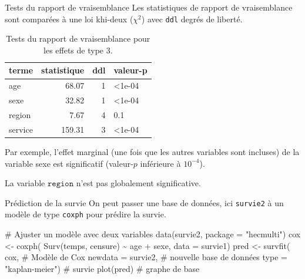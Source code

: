 \documentclass[
  ignorenonframetext,
]{beamer}
\newenvironment{Shaded}{\begin{snugshade}}{\end{snugshade}}
\newcommand{\AttributeTok}[1]{\textcolor[rgb]{0.40,0.45,0.13}{#1}}
\newcommand{\CommentTok}[1]{\textcolor[rgb]{0.37,0.37,0.37}{#1}}
\newcommand{\FunctionTok}[1]{\textcolor[rgb]{0.28,0.35,0.67}{#1}}
\newcommand{\NormalTok}[1]{\textcolor[rgb]{0.00,0.23,0.31}{#1}}
\newcommand{\OtherTok}[1]{\textcolor[rgb]{0.00,0.23,0.31}{#1}}
\newcommand{\SpecialCharTok}[1]{\textcolor[rgb]{0.37,0.37,0.37}{#1}}
\newcommand{\StringTok}[1]{\textcolor[rgb]{0.13,0.47,0.30}{#1}}
\begin{document}
\begin{frame}[fragile]{Tests du rapport de vraisemblance}
\protect{}\label{tests-du-rapport-de-vraisemblance}
Les statistiques de rapport de vraisemblance sont comparées à une loi
khi-deux (\(\chi^2\)) avec \texttt{ddl} degrés de liberté.

\begin{longtable}[t]{lrrl}

\caption{\label{tbl-survie5-deviance}Tests du rapport de vraisemblance
pour les effets de type 3.}

\tabularnewline

\toprule
terme & statistique & ddl & valeur-p\\
\midrule
age & 68.07 & 1 & <1e-04\\
sexe & 32.82 & 1 & <1e-04\\
region & 7.67 & 4 & 0.1\\
service & 159.31 & 3 & <1e-04\\
\bottomrule

\end{longtable}

Par exemple, l'effet marginal (une fois que les autres variables sont
incluses) de la variable sexe est significatif (valeur-\(p\) inférieure
à \(10^{-4}\)).

La variable \(\texttt{region}\) n'est pas globalement significative.
\end{frame}

\begin{frame}[fragile]{Prédiction de la survie}
\protect{}\label{pruxe9diction-de-la-survie}
On peut passer une base de données, ici \texttt{survie2} à un modèle de
type \texttt{coxph} pour prédire la survie.

\begin{Shaded}
\begin{Highlighting}[numbers=left,,]
\CommentTok{\# Ajuster un modèle avec deux variables}
\FunctionTok{data}\NormalTok{(survie2, }\AttributeTok{package =} \StringTok{"hecmulti"}\NormalTok{)}
\NormalTok{cox }\OtherTok{\textless{}{-}} \FunctionTok{coxph}\NormalTok{(}
  \FunctionTok{Surv}\NormalTok{(temps, censure) }\SpecialCharTok{\textasciitilde{}} 
\NormalTok{    age }\SpecialCharTok{+}\NormalTok{ sexe, }
  \AttributeTok{data =}\NormalTok{ survie1)}
\NormalTok{pred }\OtherTok{\textless{}{-}} \FunctionTok{survfit}\NormalTok{(}
\NormalTok{  cox,       }\CommentTok{\# Modèle de Cox}
  \AttributeTok{newdata =}\NormalTok{ survie2, }\CommentTok{\# nouvelle base de données}
  \AttributeTok{type =} \StringTok{"kaplan{-}meier"}\NormalTok{) }\CommentTok{\# survie}
\FunctionTok{plot}\NormalTok{(pred) }\CommentTok{\# graphe de base}
\end{Highlighting}
\end{Shaded}
\end{frame}
\end{document}
